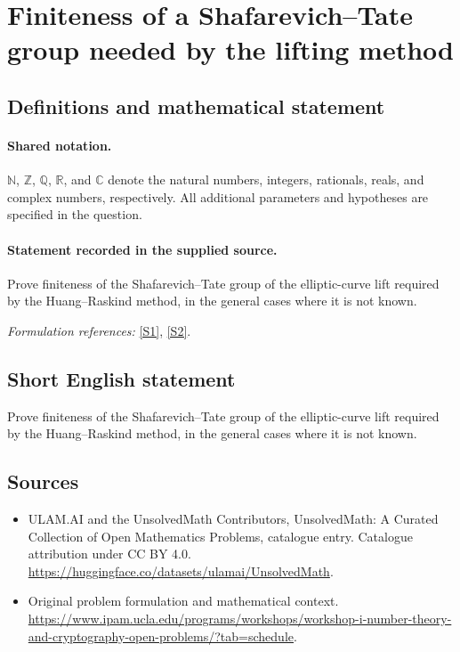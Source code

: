\documentclass[11pt]{article}
\newcommand{\sref}[2]{\hyperlink{source:#1:#2}{[S#2]}}
\begin{document}
\section{Finiteness of a Shafarevich–Tate group needed by the lifting method}\label{statement}

\subsection{Definitions and mathematical statement}

\paragraph{Shared notation.}$\mathbb N$, $\mathbb Z$, $\mathbb Q$, $\mathbb R$, and $\mathbb C$ denote the natural numbers, integers, rationals, reals, and complex numbers, respectively. All additional parameters and hypotheses are specified in the question.


\paragraph{Statement recorded in the supplied source.}
Prove finiteness of the Shafarevich–Tate group of the elliptic-curve lift required by the Huang–Raskind method, in the general cases where it is not known.
\par\smallskip\textit{Formulation references:} \sref{statement}{1}, \sref{statement}{2}.
\subsection{Short English statement}
Prove finiteness of the Shafarevich–Tate group of the elliptic-curve lift required by the Huang–Raskind method, in the general cases where it is not known.
\subsection{Sources}
\begin{itemize}
\item[\hypertarget{source:statement:1}{S1}] ULAM.AI and the UnsolvedMath Contributors, UnsolvedMath: A Curated Collection of Open Mathematics Problems, catalogue entry. Catalogue attribution under CC BY 4.0.
\url{https://huggingface.co/datasets/ulamai/UnsolvedMath}.
\item[\hypertarget{source:statement:2}{S2}] Original problem formulation and mathematical context.
\url{https://www.ipam.ucla.edu/programs/workshops/workshop-i-number-theory-and-cryptography-open-problems/?tab=schedule}.
\end{itemize}
\label{end:statement}
\end{document}
